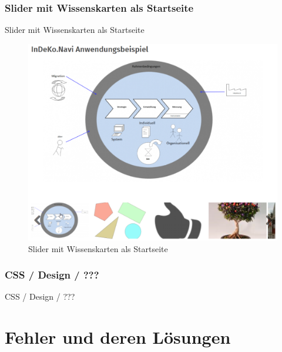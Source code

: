 \subsubsection{Slider mit Wissenskarten als Startseite}\label{subsub:wkslider}
Slider mit Wissenskarten als Startseite
\begin{figure}[H]
	\centering
	\includegraphics[height=0.20\textheight]{images/example_slider}
	\caption[]{Slider mit Wissenskarten als Startseite}
	\label{fig:example_slider}
\end{figure}

\subsubsection{CSS / Design / ???}\label{subsub:cssdesign}
CSS / Design / ???



\section{Fehler und deren Lösungen}\label{sec:problems}

